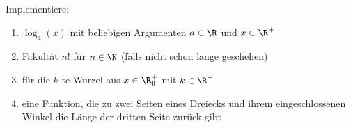 \begin{aufg}
Implementiere:
\begin{enumerate}
  \item $\log_a(x)$ mit beliebigen Argumenten $a \in \R$ und $x \in \R^+$
  \item Fakultät $n!$ für $n \in \N$ (falls nicht schon lange geschehen)
  \item für die $k$-te Wurzel aus $x\in \R^+_0$ mit $k \in \R^+$
  \item eine Funktion, die zu zwei Seiten eines Dreiecks und ihrem eingeschlossenen Winkel die Länge der dritten Seite zurück gibt
\end{enumerate}
\end{aufg}